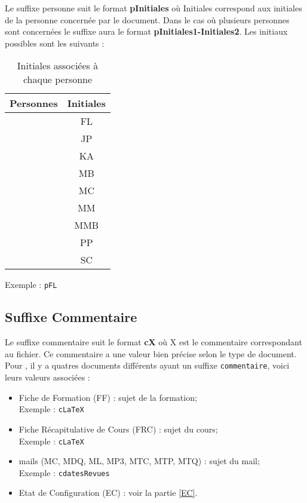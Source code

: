 Le suffixe personne suit le format \textbf{pInitiales} où Initiales correspond aux initiales de la personne concernée par le document. Dans le cas où plusieurs personnes sont concernées le suffixe aura le format \textbf{pInitiales1-Initiales2}. Les initiaux possibles sont les suivants :
\begin{table}[H]
	\centering
	\begin{tabularx}{8cm}{|X|c|}
	\hline
	\rowcolor[gray]{0.85} Personnes & Initiales\\
	\hline
	\Florian & FL \\
	\hline
	\Julie & JP \\
	\hline
	\Kafui & KA \\
	\hline
	\Melissa & MB \\
	\hline
	\Michel & MC \\
	\hline
	\Mathieu & MM \\
	\hline
	\Matthieu & MMB \\
	\hline
	\Pierre & PP \\
	\hline
	\Sergi & SC \\
	\hline
	\end{tabularx}
	\caption{Initiales associées à chaque personne}
	\label{Initiales}
\end{table}

Exemple : \verb+pFL+

\subsection{Suffixe Commentaire}
\label{suffixe_commentaire}

Le suffixe commentaire suit le format \textbf{cX} où X est le commentaire correspondant au fichier. Ce commentaire a une valeur bien précise selon le type de document. Pour \nomEquipe, il y a quatres documents différents ayant un suffixe \verb+commentaire+, voici leurs valeurs associées :
\begin{itemize}
\item Fiche de Formation (FF) : sujet de la formation;\\
 Exemple : \verb+cLaTeX+
 \item Fiche Récapitulative de Cours (FRC) : sujet du cours;\\
 Exemple : \verb+cLaTeX+
\item mails (MC, MDQ, ML, MP3, MTC, MTP, MTQ) : sujet du mail;\\
 Exemple : \verb+cdatesRevues+
\item Etat de Configuration (EC) : voir la partie \ref{EC}.
\end{itemize}
